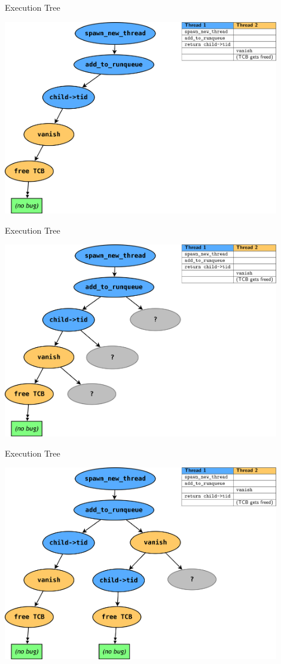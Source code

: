 \documentclass[xcolor=dvipsnames]{beamer}
\begin{document}

\begin{frame}{Execution Tree}
	\begin{center}
		\includegraphics[width=0.9\textwidth]{threadfork0.png}
	\end{center}
\end{frame}
\begin{frame}{Execution Tree}
	\begin{center}
		\includegraphics[width=0.9\textwidth]{threadfork05.png}
	\end{center}
\end{frame}
\begin{frame}{Execution Tree}
	\begin{center}
		\includegraphics[width=0.9\textwidth]{threadfork1.png}
	\end{center}
\end{frame}
\end{document}
